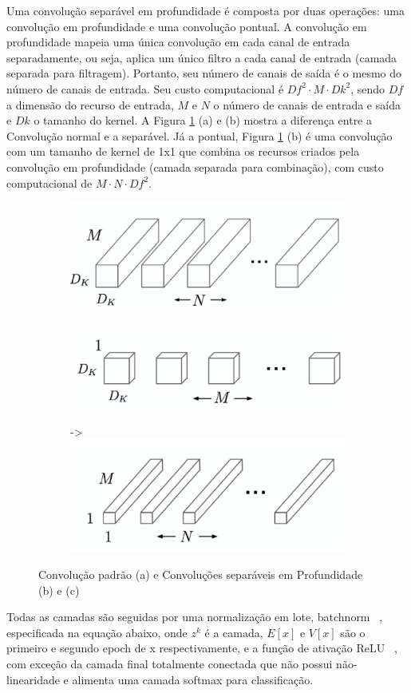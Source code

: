 \documentclass{bmvc2k}
\begin{document}
Uma convolução separável em profundidade é composta por duas operações: uma convolução em profundidade e uma convolução pontual. A convolução em profundidade mapeia uma única convolução em cada canal de entrada separadamente, ou seja, aplica um único filtro a cada canal de entrada (camada  separada para filtragem). Portanto, seu número de canais de saída é o mesmo do número de canais de entrada. Seu custo computacional é $Df^2 \cdot M \cdot Dk^2$, sendo $Df$ a dimensão do recurso de entrada, $M$ e $N$ o número de canais de entrada e saída e $Dk$ o tamanho do kernel. A Figura \ref{MN} (a) e (b)
mostra a diferença entre a Convolução normal e a separável. Já a pontual, Figura \ref{MN} (b) é uma convolução com um tamanho de kernel de 1x1 que combina os recursos criados pela convolução em profundidade (camada separada para combinação), com custo computacional de $M \cdot N \cdot Df^2$.


\begin{figure}[h]
\centering
    \begin{subfigure}[]
        \centering
         \includegraphics[width=0.4\linewidth]{imagens/mn1.png} 
    \end{subfigure}

    \begin{subfigure}[]
    \centering
         \includegraphics[width=0.4\linewidth]{imagens/mn2.png} ->
         \includegraphics[width=0.4\linewidth]{imagens/mn3.png}
    \end{subfigure}
    \label{MN}
    \caption{Convolução padrão (a) e Convoluções separáveis em Profundidade (b) e (c)~\cite{mobilenets}}
\end{figure}


Todas as camadas são seguidas por uma normalização em lote, batchnorm ~\cite{batch}, especificada na equação abaixo, onde $z^k$ é a camada, $E[x]$ e $V[x]$ são o primeiro e segundo epoch de x respectivamente, e  a função de ativação ReLU ~\cite{relu}, com exceção da camada final totalmente conectada que não possui não-linearidade e alimenta uma camada softmax para classificação.
\end{document}
